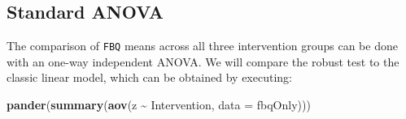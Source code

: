 \documentclass[
]{article}
\newenvironment{Shaded}{\begin{snugshade}}{\end{snugshade}}
\newcommand{\AttributeTok}[1]{\textcolor[rgb]{0.13,0.29,0.53}{#1}}
\newcommand{\FunctionTok}[1]{\textcolor[rgb]{0.13,0.29,0.53}{\textbf{#1}}}
\newcommand{\NormalTok}[1]{#1}
\newcommand{\SpecialCharTok}[1]{\textcolor[rgb]{0.81,0.36,0.00}{\textbf{#1}}}
\begin{document}
\subsection*{Standard ANOVA}\label{standard-anova}

The comparison of \texttt{FBQ} means across all three intervention groups can be done with an one-way independent ANOVA. We will compare the robust test to the classic linear model,
which can be obtained by executing:

\begin{Shaded}
\begin{Highlighting}[]
    \FunctionTok{pander}\NormalTok{(}\FunctionTok{summary}\NormalTok{(}\FunctionTok{aov}\NormalTok{(z }\SpecialCharTok{\textasciitilde{}}\NormalTok{ Intervention, }\AttributeTok{data =}\NormalTok{ fbqOnly)))}
\end{Highlighting}
\end{Shaded}
\end{document}
